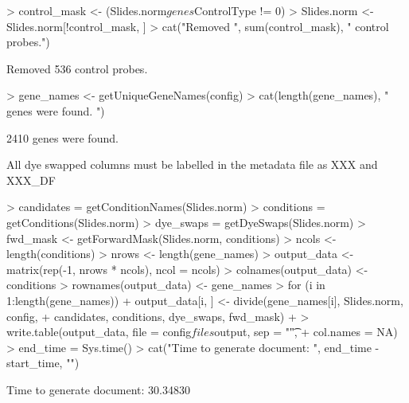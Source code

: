 \documentclass[titlepage]{article}
\begin{document}
\begin{Schunk}
\begin{Sinput}
> control_mask <- (Slides.norm$genes$ControlType != 0)
> Slides.norm <- Slides.norm[!control_mask, ]
> cat("Removed ", sum(control_mask), " control probes.\n")
\end{Sinput}
\begin{Soutput}
Removed  536  control probes.
\end{Soutput}
\begin{Sinput}
> gene_names <- getUniqueGeneNames(config)
> cat(length(gene_names), " genes were found. ")
\end{Sinput}
\begin{Soutput}
2410  genes were found. 
\end{Soutput}
\end{Schunk}
All dye swapped columns must be labelled in the metadata file as XXX and XXX\_DF
\begin{Schunk}
\begin{Sinput}
> candidates = getConditionNames(Slides.norm)
> conditions = getConditions(Slides.norm)
> dye_swaps = getDyeSwaps(Slides.norm)
> fwd_mask <- getForwardMask(Slides.norm, conditions)
> ncols <- length(conditions)
> nrows <- length(gene_names)
> output_data <- matrix(rep(-1, nrows * ncols), ncol = ncols)
> colnames(output_data) <- conditions
> rownames(output_data) <- gene_names
> for (i in 1:length(gene_names)) {
+     output_data[i, ] <- divide(gene_names[i], Slides.norm, config, 
+         candidates, conditions, dye_swaps, fwd_mask)
+ }
> write.table(output_data, file = config$files$output, sep = "\t", 
+     col.names = NA)
> end_time = Sys.time()
> cat("Time to generate document: ", end_time - start_time, "\n")
\end{Sinput}
\begin{Soutput}
Time to generate document:  30.34830 
\end{Soutput}
\end{Schunk}
\end{document}

